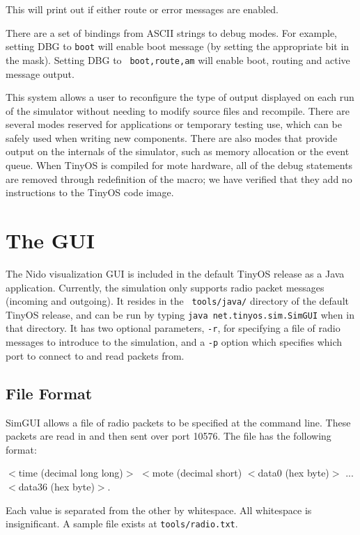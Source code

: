 \documentclass[10pt]{article}
\begin{document}
This will print out if either route or error messages are enabled.

There are a set of bindings from ASCII strings to debug modes. For
example, setting DBG to {\tt boot} will enable boot message (by
setting the appropriate bit in the mask). Setting DBG to {\tt
boot,route,am} will enable boot, routing and active message output.

This system allows a user to reconfigure the type of output displayed
on each run of the simulator without needing to modify source files
and recompile. There are several modes reserved for applications or
temporary testing use, which can be safely used when writing new
components. There are also modes that provide output on the internals
of the simulator, such as memory allocation or the event queue. When
TinyOS is compiled for mote hardware, all of the debug statements are
removed through redefinition of the macro; we have verified that they
add no instructions to the TinyOS code image.

\section*{The GUI}

The Nido visualization GUI is included in the default TinyOS release
as a Java application. Currently, the simulation only supports radio
packet messages (incoming and outgoing). It resides in the {\tt
tools/java/} directory of the default TinyOS release, and can be run
by typing {\tt java net.tinyos.sim.SimGUI} when in that
directory. It has two optional parameters, {\tt -r}, for specifying a
file of radio messages to introduce to the simulation, and a {\tt -p}
option which specifies which port to connect to and read packets from.

\subsection*{File Format}

SimGUI allows a file of radio packets to be specified at the
command line. These packets are read in and then sent over port
10576. The file has the following format:

\vspace{0.1in}
$<$time (decimal long long)$>$ $<$mote (decimal short) $<$data0 (hex byte)$>$ ... $<$data36 (hex byte)$>$.
\vspace{0.1in}

Each value is separated from the other by whitespace. All whitespace
is insignificant. A sample file exists at {\tt tools/radio.txt}.
\end{document}
